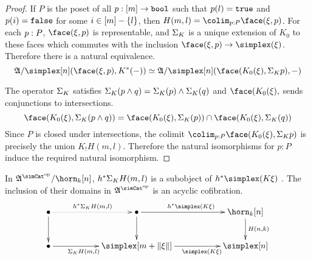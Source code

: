 \begin{proof} If $P$ is the poset of all $p:[m]\to\mathtt{bool}$ such that $p(l)=\mathtt{true}$ and $p(i)=\mathtt{false}$ for some $i\in [m]-\left\{l\right\}$, then $H(m,l) = \colim_{p\of P}\face(\xi,p)$.
For each $p: P$, $\face(\xi,p)$ is representable, and $\Sigma_ K$ is a unique extension of $K_0$ to these faces which commutes with the inclusion $\face(\xi,p)\to\simplex(\xi)$. Therefore there is a natural equivalence.
\[ \ambient/\simplex[n](\face(\xi,p),K\ri(-))\simeq \ambient/\simplex[n](\face(K_0(\xi),\depsum K p),-) \]

The operator $\Sigma_ K$ satisfies $\Sigma_ K(p\land q)=\Sigma_ K(p)\land \Sigma_ K(q)$ and $\face(K_0(\xi),$ sends conjunctions to intersections.
\[ \face(K_0(\xi),\depsum K(p\land q)) = \face(K_0(\xi),\depsum K(p))\cap \face(K_0(\xi),\depsum K(q)) \]
Since $P$ is closed under intersections, the colimit $\colim_{p\of P}\face(K_0(\xi),\depsum K p)$ is precisely the union $K_!H(m,l)$. Therefore the natural isomorphisms for $p:P$ induce the required natural isomorphism.
\end{proof}

\begin{lemma} In $\ambient\s/\horn_k[n]$, $h^* \Sigma_ K H(m,l)$ is a subobject of $h\ri\simplex(K\xi)$ . The inclusion of their domains in $\ambient\s$ is an acyclic cofibration. \label{acyclic cofibrancy} 
\[\xymatrix{
\bullet \ar@{.>}[rr]^{h\ri \depsum K H(m,l)} \ar[d] && \bullet\ar[rr]^{h\ri\simplex(K\xi)}\ar[d] && \horn_k[n]\ar[d]^{H(n,k)}\\
\bullet\ar[rr]_(.4){\depsum K H(m,l)} && \simplex[m+\norm\xi]\ar[rr]_(.6){\simplex(K\xi)} && \simplex[n]
}\]
\end{lemma}


